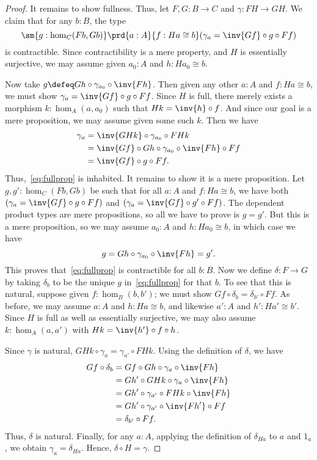 \begin{proof}
  It remains to show fullness.
  Thus, let $F,G:B\to C$ and $\gamma:FH \to GH$.
  We claim that for any $b:B$, the type
  \begin{equation}\label{eq:fullprop}
    \sm{g:\hom_C(Fb,Gb)} \prd{a:A}{f:Ha\cong b} (\gamma_a =  \inv{Gf}\circ g\circ Ff)
  \end{equation}
  is contractible.
  Since contractibility is a mere property, and $H$ is essentially surjective, we may assume given $a_0:A$ and $h:Ha_0\cong b$.

  Now take $g\defeq Gh \circ \gamma_{a_0} \circ \inv{Fh}$.
  Then given any other $a:A$ and $f:Ha\cong b$, we must show $\gamma_a =  \inv{Gf}\circ g\circ Ff$.
  Since $H$ is full, there merely exists a morphism $k:\hom_A(a,a_0)$ such that $Hk = \inv{h}\circ f$.
  And since our goal is a mere proposition, we may assume given some such $k$.
  Then we have
  \begin{align*}
    \gamma_a &= \inv{GHk}\circ \gamma_{a_0} \circ FHk\\
    &= \inv{Gf} \circ Gh \circ \gamma_{a_0} \circ \inv{Fh} \circ Ff\\
    &= \inv{Gf}\circ g\circ Ff.
  \end{align*}
  Thus,~\eqref{eq:fullprop} is inhabited.
  It remains to show it is a mere proposition.
  Let $g,g':\hom_C(Fb, Gb)$ be such that for all $a:A$ and $f:Ha\cong b$, we have both $(\gamma_a =  \inv{Gf}\circ g\circ Ff)$ and $(\gamma_a =  \inv{Gf}\circ g'\circ Ff)$.
  The dependent product types are mere propositions, so all we have to prove is $g=g'$.
  But this is a mere proposition, so we may assume $a_0:A$ and $h:Ha_0\cong b$, in which case we have
  \[ g = Gh \circ \gamma_{a_0} \circ \inv{Fh} = g'.\]
  This proves that~\eqref{eq:fullprop} is contractible for all $b:B$.
  Now we define $\delta:F\to G$ by taking $\delta_b$ to be the unique $g$ in~\eqref{eq:fullprop} for that $b$.
  To see that this is natural, suppose given $f:\hom_B(b,b')$; we must show $Gf \circ \delta_b = \delta_{b'}\circ Ff$.
  As before, we may assume $a:A$ and $h:Ha\cong b$, and likewise $a':A$ and $h':Ha'\cong b'$.
  Since $H$ is full as well as essentially surjective, we may also assume $k:\hom_A(a,a')$ with $Hk = \inv{h'}\circ f\circ h$.

  Since $\gamma$ is natural, $GHk\circ \gamma_a = \gamma_{a'} \circ FHk$.
  Using the definition of $\delta$, we have
  \begin{align*}
    Gf \circ \delta_b
    &= Gf \circ Gh \circ \gamma_a \circ \inv{Fh}\\
    &= Gh' \circ GHk\circ \gamma_a \circ \inv{Fh}\\
    &= Gh' \circ \gamma_{a'} \circ FHk \circ \inv{Fh}\\
    &= Gh' \circ \gamma_{a'} \circ \inv{Fh'} \circ Ff\\
    &= \delta_{b'} \circ Ff.
  \end{align*}
  Thus, $\delta$ is natural.
  Finally, for any $a:A$, applying the definition of $\delta_{Ha}$ to $a$ and $1_a$, we obtain $\gamma_a = \delta_{Ha}$.
  Hence, $\delta \circ H = \gamma$.
\end{proof}

